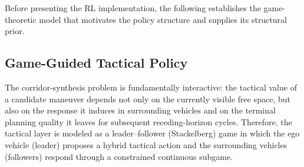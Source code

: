 \documentclass{iopjournal}
\begin{document}
Before presenting the RL implementation, the following establishes the
game-theoretic model that motivates the policy structure and supplies its
structural prior.

\subsection{Game-Guided Tactical Policy}
\label{subsec:game_formulation}\label{subsec:theory_guided_rl}

The corridor-synthesis problem is fundamentally interactive: the tactical
value of a candidate maneuver depends not only on the currently visible free
space, but also on the response it induces in surrounding vehicles and on the
terminal planning quality it leaves for subsequent receding-horizon cycles.
Therefore, the tactical layer is modeled as a leader--follower (Stackelberg)
game in which the ego vehicle (leader) proposes a hybrid tactical action and
the surrounding vehicles (followers) respond through a constrained continuous
subgame.
\end{document}
